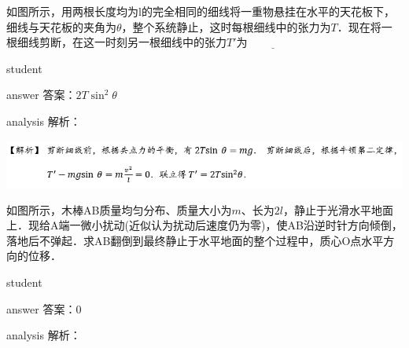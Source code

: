 \begin{example}
	 如图所示，用两根长度均为l的完全相同的细线将一重物悬挂在水平的天花板下，细线与天花板的夹角为$ \theta $，整个系统静止，这时每根细线中的张力为$ T $．现在将一根细线剪断，在这一时刻另一根细线中的张力$ T' $为 $\underline{ \qquad\qquad }$  
	
	\begin{taggedblock}{student}
		\vspace*{1cm}
	\end{taggedblock}
	
	
	\begin{taggedblock}{answer}
		答案：$ 2T\sin^2\theta $
	\end{taggedblock}
	
	
	\begin{taggedblock}{analysis}
		解析：	\begin{center}
			\includegraphics[width=\linewidth]{image/newton-24}
		\end{center}
	\end{taggedblock}
\end{example}



\begin{example}
	 如图所示，木棒AB质量均匀分布、质量大小为$ m $、长为$ 2l $，静止于光滑水平地面上．现给A端一微小扰动(近似认为扰动后速度仍为零)，使AB沿逆时针方向倾倒，落地后不弹起．求AB翻倒到最终静止于水平地面的整个过程中，质心O点水平方向的位移．
	
	\begin{taggedblock}{student}
		\vspace*{2cm}
	\end{taggedblock}
	
	
	\begin{taggedblock}{answer}
		答案：0
	\end{taggedblock}
	
	
	\begin{taggedblock}{analysis}
		解析：
	\end{taggedblock}
\end{example}
